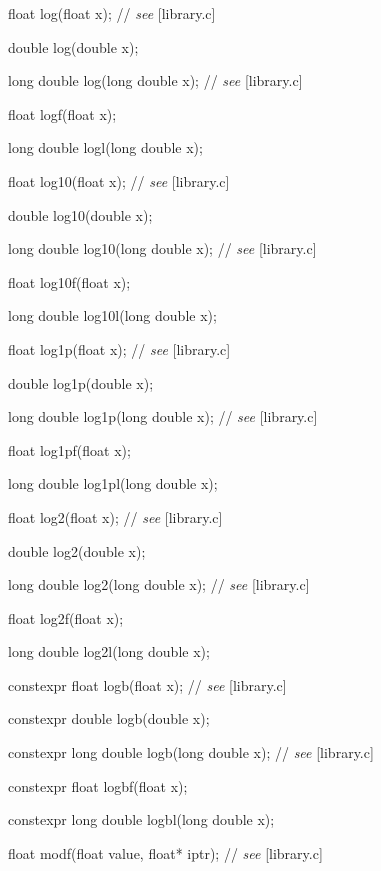 \documentclass[prd,twocolumn,amsmath,amssymb,nofootinbib,eqsecnum]{revtex4-1}
\newcommand{\highlight}[1]{{\color{red} #1}}
\newcommand{\stdcomment}[1]{{// {\em see} [#1]}}
\begin{document}
{float log(float x); \stdcomment{library.c}

double log(double x);

long double log(long double x); \stdcomment{library.c}

float logf(float x);

long double logl(long double x);

\vspace{2ex}

float log10(float x); \stdcomment{library.c}

double log10(double x);

long double log10(long double x); \stdcomment{library.c}

float log10f(float x);

long double log10l(long double x);

\vspace{2ex}

float log1p(float x); \stdcomment{library.c}

double log1p(double x);

long double log1p(long double x); \stdcomment{library.c}

float log1pf(float x);

long double log1pl(long double x);

\vspace{2ex}

float log2(float x); \stdcomment{library.c}

double log2(double x);

long double log2(long double x); \stdcomment{library.c}

float log2f(float x);

long double log2l(long double x);

\vspace{2ex}

\highlight{constexpr} float logb(float x); \stdcomment{library.c}

\highlight{constexpr} double logb(double x);

\highlight{constexpr} long double logb(long double x); \stdcomment{library.c}

\highlight{constexpr} float logbf(float x);

\highlight{constexpr} long double logbl(long double x);

\vspace{2ex}

float modf(float value, float* iptr); \stdcomment{library.c}

}
\end{document}
